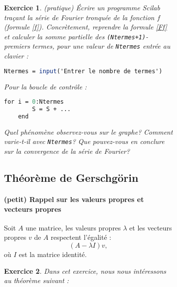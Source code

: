 \documentclass[a4paper,11pt]{article}
\newtheorem{exo}{Exercice}
\begin{document}
\begin{figure}
\begin{figure}
\begin{exo} {\it (pratique)} Écrire un programme Scilab traçant la
  série de Fourier tronquée de la fonction $f$ (formule \eqref{f}).
  Concrètement, reprendre la formule \eqref{Ff} et calculer la somme
  partielle des {\tt (Ntermes+1)}-premiers termes, pour une valeur de
  {\tt Ntermes} entrée au clavier :
  \begin{lstlisting}[language=scilab]
    Ntermes = input('Entrer le nombre de termes')
  \end{lstlisting}
  Pour la boucle de contrôle :
  \begin{lstlisting}[language=scilab]
    for i = 0:Ntermes
        S = S + ...
    end
  \end{lstlisting}
  Quel phénomène observez-vous sur le graphe? Comment varie-t-il avec
  {\tt Ntermes}? Que pouvez-vous en conclure sur la convergence de la
  série de Fourier?
\end{exo}


\subsection{Théorème de Gerschg\"orin}

\paragraph*{(petit) Rappel sur les valeurs propres et vecteurs propres}
Soit $A$ une matrice, les valeurs propres $\lambda$ et les vecteurs propres
$v$ de $A$ respectent l'égalité :
\begin{equation}
	(A - \lambda I)v,
\end{equation}
où $I$ est la matrice identité.

\begin{exo} Dans cet exercice, nous nous intéressons au théorème suivant :\\


\end{exo}
\end{figure}
\end{figure}
\end{document}
